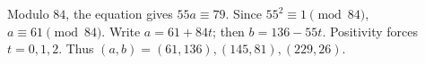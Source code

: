 Modulo $84$, the equation gives $55a\equiv79$. Since $55^2\equiv1\pmod{84}$, $a\equiv61\pmod{84}$. Write $a=61+84t$; then $b=136-55t$. Positivity forces $t=0,1,2$. Thus $\boxed{(a,b)=(61,136),(145,81),(229,26)}$.
